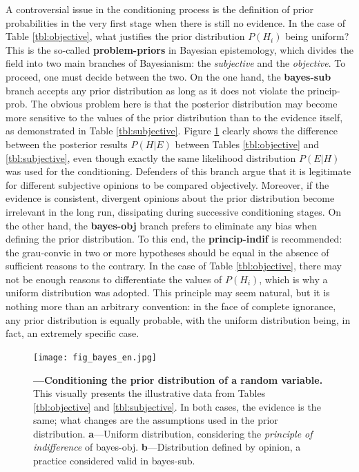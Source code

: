 \documentclass[./main_en.tex]{subfiles}
\begin{document}
\par A controversial issue in the \gls{conditioning} process is the definition of prior probabilities in the very first stage when there is still no evidence. In the case of Table \ref{tbl:objective}, what justifies the \gls{prior} distribution $P(H_i)$ being uniform? This is the so-called \textbf{\gls{problem-priors}} in Bayesian epistemology, which divides the field into two main branches of Bayesianism: the \textit{subjective} and the \textit{objective}. To proceed, one must decide between the two. On the one hand, the \textbf{\gls{bayes-sub}} branch accepts any \gls{prior} distribution as long as it does not violate the \gls{princip-prob}. The obvious problem here is that the posterior distribution may become more sensitive to the values of the prior distribution than to the evidence itself, as demonstrated in Table \ref{tbl:subjective}. Figure \ref{fig:bayes} clearly shows the difference between the posterior results $P(H | E)$ between Tables \ref{tbl:objective} and \ref{tbl:subjective}, even though exactly the same \gls{likelihood} distribution $P(E | H)$ was used for the \gls{conditioning}. Defenders of this branch argue that it is legitimate for different subjective opinions to be compared objectively. Moreover, if the evidence is consistent, divergent opinions about the prior distribution become irrelevant in the long run, dissipating during successive \gls{conditioning} stages. On the other hand, the \textbf{\gls{bayes-obj}} branch prefers to eliminate any bias when defining the prior distribution. To this end, the \textbf{\gls{princip-indif}} is recommended: the \gls{grau-convic} in two or more hypotheses should be equal in the absence of sufficient reasons to the contrary. In the case of Table \ref{tbl:objective}, there may not be enough reasons to differentiate the values of $P(H_i)$, which is why a uniform distribution was adopted. This principle may seem natural, but it is nothing more than an arbitrary convention: in the face of complete ignorance, any \gls{prior} distribution is equally probable, with the uniform distribution being, in fact, an extremely specific case.

\begin{figure}[t!] %
	\centering				
	\texttt{[image: fig\_bayes\_en.jpg]}		
	\caption[Example of Bayesian conditioning]
	{\textbf{---\;Conditioning the prior distribution of a random variable.}
        This visually presents the illustrative data from Tables \ref{tbl:objective} and \ref{tbl:subjective}. In both cases, the evidence is the same; what changes are the assumptions used in the prior distribution. \;\textbf{a}\;---\;Uniform distribution, considering the \textit{principle of indifference} of \gls{bayes-obj}. \;\textbf{b}\;---\;Distribution defined by opinion, a practice considered valid in \gls{bayes-sub}.  
	}
\label{fig:bayes}  %
\end{figure}
\end{document}
